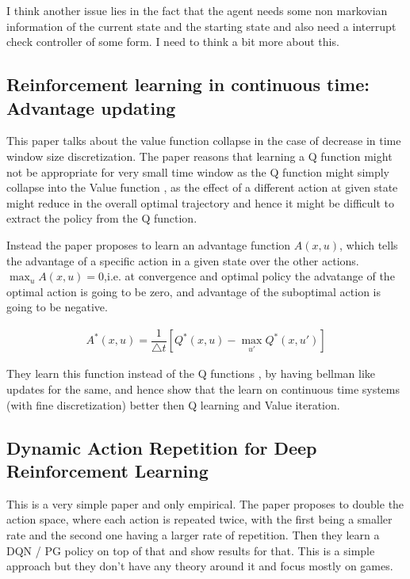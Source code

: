 \documentclass[11pt]{article}
\begin{document}
I think another issue lies in the fact that the agent needs some non markovian information of the current state and the starting state and also need a interrupt check controller of some form. I need to think a bit more about this. 


\subsection{Reinforcement learning in continuous time: Advantage updating} \cite{baird1994reinforcement}

This paper talks about the value function collapse in the case of decrease in time window size discretization. The paper reasons that learning a Q function might not be appropriate for very small time window as the Q function might simply collapse into the Value function , as the effect of a different action at given state might reduce in the overall optimal trajectory and hence it might be difficult to extract the policy from the Q function. 

Instead the paper proposes to learn an advantage function $A(x, u)$, which tells the advantage of a specific action in a given state over the other actions. $\max_u A(x,u) = 0$,i.e. at convergence and optimal policy the advatange of the optimal action is going to be zero, and advantage of the suboptimal action is going to be negative.  

\begin{align*}
    A^*(x,u) = \dfrac{1}{\triangle t} \left[ Q^*(x, u) - \max_{u'} Q^*(x, u') \right]
\end{align*}


They learn this function instead of the Q functions , by having bellman like updates for the same, and hence show that the learn on continuous time systems (with fine discretization) better then Q learning and Value iteration. 


\subsection{Dynamic Action Repetition for Deep Reinforcement Learning} \cite{lakshminarayanan2017dynamic}

This is a very simple paper and only empirical. The paper proposes to double the action space, where each action is repeated twice, with the first being a smaller rate and the second one having a larger rate of repetition. Then they learn a DQN / PG policy on top of that and show results for that. This is a simple approach but they don't have any theory around it and focus mostly on games. 
\end{document}
